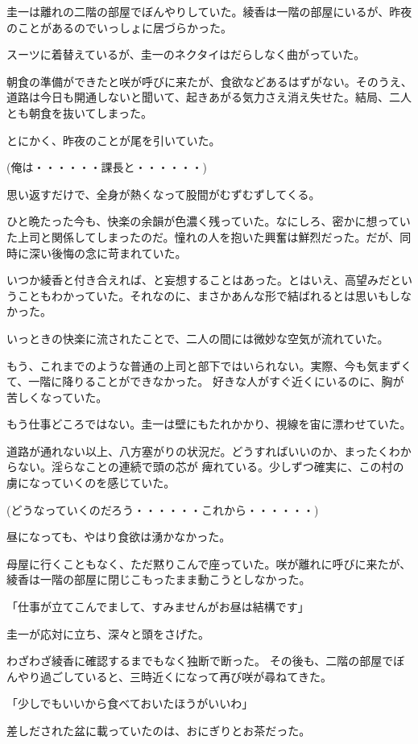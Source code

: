 ﻿\documentclass[book,tate]{jlreq}
\begin{document}
圭一は離れの二階の部屋でぼんやりしていた。綾香は一階の部屋にいるが、昨夜のことがあるのでいっしょに居づらかった。

スーツに着替えているが、圭一のネクタイはだらしなく曲がっていた。

朝食の準備ができたと咲が呼びに来たが、食欲などあるはずがない。そのうえ、道路は今日も開通しないと聞いて、起きあがる気力さえ消え失せた。結局、二人とも朝食を抜いてしまった。

とにかく、昨夜のことが尾を引いていた。

(俺は・・・・・・課長と・・・・・・)

思い返すだけで、全身が熱くなって股間がむずむずしてくる。

ひと晩たった今も、快楽の余韻が色濃く残っていた。なにしろ、密かに想っていた上司と関係してしまったのだ。憧れの人を抱いた興奮は鮮烈だった。だが、同時に深い後悔の念に苛まれていた。

いつか綾香と付き合えれば、と妄想することはあった。とはいえ、高望みだということもわかっていた。それなのに、まさかあんな形で結ばれるとは思いもしなかった。

いっときの快楽に流されたことで、二人の間には微妙な空気が流れていた。

もう、これまでのような普通の上司と部下ではいられない。実際、今も気まずくて、一階に降りることができなかった。 好きな人がすぐ近くにいるのに、胸が苦しくなっていた。

もう仕事どころではない。圭一は壁にもたれかかり、視線を宙に漂わせていた。

道路が通れない以上、八方塞がりの状況だ。どうすればいいのか、まったくわからない。淫らなことの連続で頭の芯が 痺れている。少しずつ確実に、この村の虜になっていくのを感じていた。

(どうなっていくのだろう・・・・・・これから・・・・・・)

昼になっても、やはり食欲は湧かなかった。

母屋に行くこともなく、ただ黙りこんで座っていた。咲が離れに呼びに来たが、綾香は一階の部屋に閉じこもったまま動こうとしなかった。

「仕事が立てこんでまして、すみませんがお昼は結構です」

圭一が応対に立ち、深々と頭をさげた。

わざわざ綾香に確認するまでもなく独断で断った。 その後も、二階の部屋でぼんやり過ごしていると、三時近くになって再び咲が尋ねてきた。

「少しでもいいから食べておいたほうがいいわ」

差しだされた盆に載っていたのは、おにぎりとお茶だった。
\end{document}

